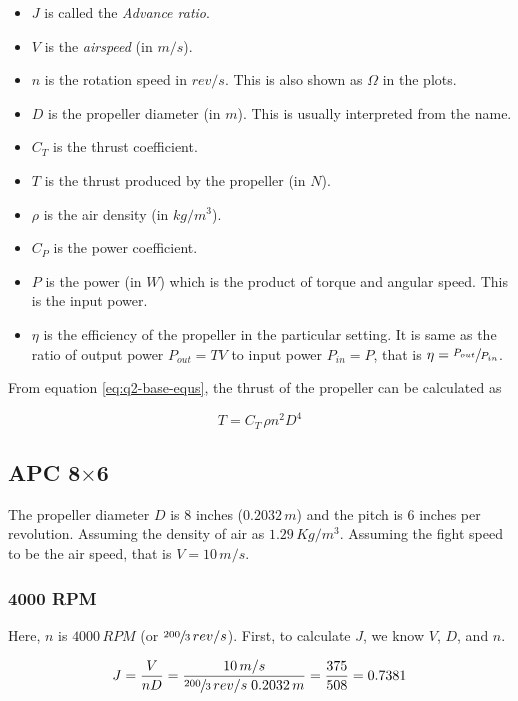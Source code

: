 \begin{itemize}
    \item $J$ is called the \emph{Advance ratio}.
    \item $V$ is the \emph{airspeed} (in $m/s$).
    \item $n$ is the rotation speed in $rev/s$. This is also shown as $\Omega$ in the plots.
    \item $D$ is the propeller diameter (in $m$). This is usually interpreted from the name.
    \item $C_T$ is the thrust coefficient.
    \item $T$ is the thrust produced by the propeller (in $N$).
    \item $\rho$ is the air density (in $kg/m^3$).
    \item $C_P$ is the power coefficient.
    \item $P$ is the power (in $W$) which is the product of torque and angular speed. This is the input power.
    \item $\eta$ is the efficiency of the propeller in the particular setting. It is same as the ratio of output power $P_{out} = TV$ to input power $P_{in} = P$, that is $\eta = \sfrac{P_{out}}{P_{in}}$.
\end{itemize}

From equation \ref{eq:q2-base-equs}, the thrust of the propeller can be calculated as

\begin{equation}
    T = C_T \, \rho n^2 D^4
    \label{eq:q2-prop-thrust}
\end{equation}

\subsection{APC 8\texorpdfstring{$\times$}{by}6}

The propeller diameter $D$ is $8$ inches ($0.2032\,m$) and the pitch is $6$ inches per revolution. Assuming the density of air as $1.29\,Kg/m^3$.
Assuming the fight speed to be the air speed, that is $V = 10\,m/s$.

\subsubsection*{4000 RPM}

Here, $n$ is $4000\,RPM$ (or $\sfrac{200}{3}\,rev/s$). First, to calculate $J$, we know $V$, $D$, and $n$.

\begin{equation*}
    J = \frac{V}{nD} = \frac{10\,m/s}{\sfrac{200}{3}\,rev/s \; 0.2032\,m} = \frac{375}{508} = 0.7381
\end{equation*}

